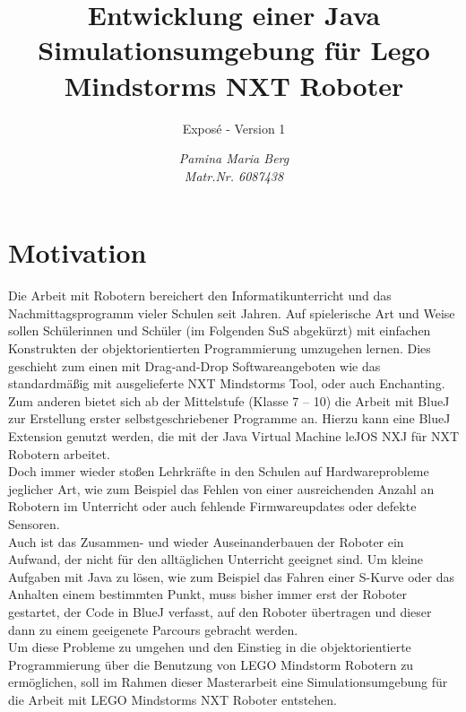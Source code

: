 \documentclass[paper=a4, pagesize, DIV=calc, BCOR=12.5mm, twoside=on, onecolumn=on, open = any, titlepage =on, parskip =half-, headsepline = on, footsepline = on, chapterprefix = on, appendixprefix = off, fontsize = 12pt, numbers = noenddot, abstract = on]{scrbook}
\numberwithin{equation}{chapter}
\begin{document}
\thispagestyle{plain}


\title{Entwicklung einer Java Simulationsumgebung für Lego Mindstorms NXT Roboter}
\subtitle{Exposé - Version 1}
\author{\emph{Pamina Maria Berg}\\
\emph{Matr.Nr. 6087438}}

\maketitle

\par \singlespacing
\section*{Motivation}
\onehalfspacing
Die Arbeit mit Robotern bereichert den Informatikunterricht und das Nachmittagsprogramm vieler Schulen seit Jahren. Auf spielerische Art und Weise sollen Schülerinnen und Schüler (im Folgenden SuS abgekürzt) mit einfachen Konstrukten der objektorientierten Programmierung umzugehen lernen. Dies geschieht zum einen mit Drag-and-Drop Softwareangeboten wie das standardmäßig mit ausgelieferte NXT Mindstorms Tool, oder auch Enchanting. Zum anderen bietet sich ab der Mittelstufe (Klasse 7 -- 10) die Arbeit mit BlueJ zur Erstellung erster selbstgeschriebener Programme an. Hierzu kann eine BlueJ Extension genutzt werden, die mit der Java Virtual Machine leJOS NXJ für NXT Robotern arbeitet.\\
Doch immer wieder stoßen Lehrkräfte in den Schulen auf Hardwareprobleme jeglicher Art, wie zum Beispiel das Fehlen von einer ausreichenden Anzahl an Robotern im Unterricht oder auch fehlende Firmwareupdates oder defekte Sensoren.\\
Auch ist das Zusammen- und wieder Auseinanderbauen der Roboter ein Aufwand, der nicht für den alltäglichen Unterricht geeignet sind. Um kleine Aufgaben mit Java zu lösen, wie zum Beispiel das Fahren einer S-Kurve oder das Anhalten einem bestimmten Punkt, muss bisher immer erst der Roboter gestartet, der Code in BlueJ verfasst, auf den Roboter übertragen und dieser dann zu einem geeigenete Parcours gebracht werden.\\
Um diese Probleme zu umgehen und den Einstieg in die objektorientierte Programmierung über die Benutzung von LEGO Mindstorm Robotern zu ermöglichen, soll im Rahmen dieser Masterarbeit eine Simulationsumgebung für die Arbeit mit LEGO Mindstorms NXT Roboter entstehen.
\end{document}
